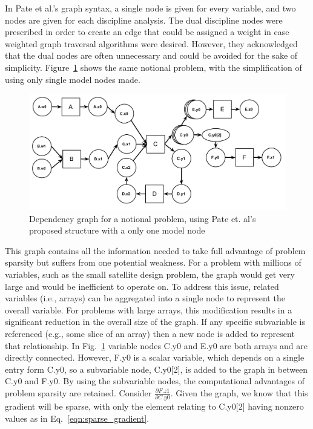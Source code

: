 \documentclass[]{aiaa-tc} %
\begin{document}
    In Pate et al.'s graph syntax, a single node is given for every variable, and two nodes are given
    for each discipline analysis. The dual discipline nodes were prescribed in order to create an edge
    that could be assigned a weight in case weighted graph traversal algorithms were desired. However,
    they acknowledged that the dual nodes are often unnecessary and could be avoided for the sake of simplicity.
    Figure~\ref{fig:sample_graph} shows the same notional problem, with the simplification of using only single
    model nodes made.

    \begin{figure}[!htb]\begin{center}
      \includegraphics[width=.8\textwidth]{images/sample_graph}
      \caption{Dependency graph for a notional problem, using Pate et. al's proposed structure with a only one model node \label{fig:sample_graph}}
    \end{center}\end{figure}


    This graph contains all the information needed to take full advantage of problem sparsity but suffers from one potential
    weakness. For a problem with millions of  variables, such as the small satellite design problem,
    the graph would get very large and would be inefficient to operate on. To address this issue,
    related variables (i.e., arrays) can be aggregated into a single node to represent the
    overall variable. For problems with large arrays, this modification results in a significant reduction
    in the overall size of the graph. If any specific subvariable is referenced (e.g., some slice of an array)
    then a new node is added to represent that relationship. In Fig.~\ref{fig:sample_graph} variable nodes C.y0 and E.y0 are both
    arrays and are directly connected. However, F.y0 is a scalar variable, which depends on a single entry form C.y0,
    so a subvariable node, C.y0[2], is added to the graph in between C.y0 and F.y0.
    By using the subvariable nodes, the computational advantages of problem sparsity are retained. Consider
    $\frac{\partial F.z1}{\partial C.y0}$. Given the graph, we know that
    this gradient will be sparse, with only the element relating to C.y0[2] having nonzero values as in Eq.~\eqref{eqn:sparse_gradient}.
\end{document}
